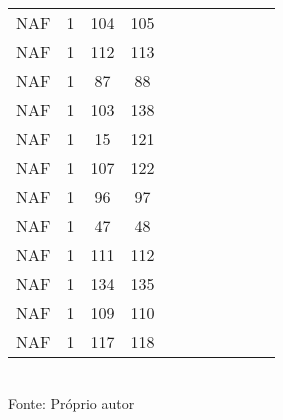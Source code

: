 \begin{table}[H]
{\begin{tabular}{ccccccccccc}
NAF & 1 & 104 & 105 &  &  &  &  &  &  &  \\
NAF & 1 & 112 & 113 &  &  &  &  &  &  &  \\
NAF & 1 & 87 & 88 &  &  &  &  &  &  &  \\
NAF & 1 & 103 & 138 &  &  &  &  &  &  &  \\
NAF & 1 & 15 & 121 &  &  &  &  &  &  &  \\
NAF & 1 & 107 & 122 &  &  &  &  &  &  &  \\
NAF & 1 & 96 & 97 &  &  &  &  &  &  &  \\
NAF & 1 & 47 & 48 &  &  &  &  &  &  &  \\
NAF & 1 & 111 & 112 &  &  &  &  &  &  &  \\
NAF & 1 & 134 & 135 &  &  &  &  &  &  &  \\
NAF & 1 & 109 & 110 &  &  &  &  &  &  &  \\
NAF & 1 & 117 & 118 &  &  &  &  &  &  &  \\
\bottomrule
\end{tabular}}
\\Fonte: Próprio autor
\end{table}


